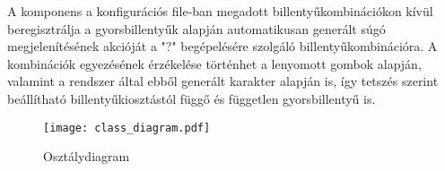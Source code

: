A komponens a konfigurációs file-ban megadott billentyűkombinációkon kívül
beregisztrálja a gyorsbillentyűk alapján automatikusan generált súgó
megjelenítésének akcióját a "?" begépelésére szolgáló billentyűkombinációra.
A kombinációk egyezésének érzékelése történhet a lenyomott gombok alapján,
valamint a rendszer által ebből generált karakter alapján is, így tetszés
szerint beállítható billentyűkiosztástól függő és független gyorsbillentyű is.

\begin{figure}[H]
  \centering
    \texttt{[image: class\_diagram.pdf]}
  \caption{Osztálydiagram}
\end{figure}
